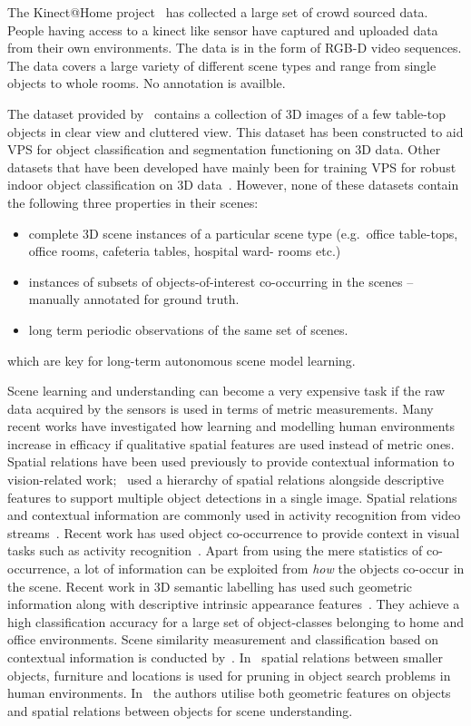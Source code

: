 \documentclass[letterpaper, 10 pt, conference]{ieeeconf}  %
\begin{document}
The Kinect@Home project~\cite{Goransson13a} has collected a large set of crowd sourced data. People having access to a kinect like sensor 
have captured and uploaded data from their own environments. The data is in the form of RGB-D video sequences. The data covers a large 
variety of different scene types and range from single objects to whole rooms. No annotation is availble.

The dataset provided by~\cite{Sun:ECCV2010} contains a collection of 3D images of a few table-top objects in clear view and cluttered view. 
This dataset has been constructed to aid VPS for object classification and segmentation functioning on 3D data. Other datasets that have 
been developed have mainly been for training VPS for robust indoor object classification on 3D data~\cite{WillowGarage:2011,Kimmel:ACCV2010}.
However, none of these datasets contain the following three properties in their scenes:
\begin{itemize}
	\item complete 3D scene instances of a particular scene type (e.g.\ office table-tops, office rooms, cafeteria tables, hospital ward-
	rooms etc.)
	\item instances of subsets of objects-of-interest co-occurring in the scenes -- manually annotated for ground truth.
	\item long term periodic observations of the same set of scenes.
\end{itemize}
which are key for long-term autonomous scene model learning.

Scene learning and understanding can become a very expensive task if the raw data acquired by the 
sensors is used in terms of metric measurements. Many recent works have investigated how learning and modelling human 
environments increase in efficacy if qualitative spatial features are used instead of metric ones. Spatial relations have been used 
previously to provide contextual information to vision-related work;~\cite{MyungJin:CVPR2010} used a hierarchy of spatial relations 
alongside descriptive features to support multiple object detections in a single image. Spatial relations and contextual information are 
commonly used in activity recognition from video streams~\cite{Krishna:ECAI2010, Behera2012}. Recent work has used object co-occurrence to 
provide context in visual tasks such as activity recognition~\cite{Li:2012}. Apart from using the mere statistics of co-occurrence, a lot of 
information can be exploited from \textit{how} the objects co-occur in the scene. Recent work in 3D semantic labelling has used such 
geometric information along with descriptive intrinsic appearance features~\cite{Koppula:NIPS2011}. They achieve a high classification 
accuracy for a large set of object-classes belonging to home and office environments. Scene similarity measurement and classification based 
on contextual information is conducted by~\cite{Fisher:ACMT2011}. In~\cite{Aydemir:ICRA2011} spatial relations between smaller objects, 
furniture and locations is used for pruning in object search problems in human environments. In~\cite{Southey:2007,kasper:2011} the authors 
utilise both geometric features on objects and spatial relations between objects for scene understanding.
\end{document}
